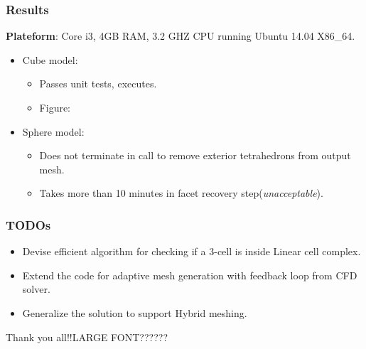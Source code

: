 \documentclass{beamer}
\begin{document}
	\begin{frame}
		\frametitle{Results} 	
		\textbf{Plateform}: Core i3, 4GB RAM, 3.2 GHZ CPU running Ubuntu 14.04 X86\_64.	
			\begin{itemize}
				\item Cube model:
					\begin{itemize}
						\item Passes unit tests, executes.
						\item Figure:
					\end{itemize}
				\item Sphere model:
					\begin{itemize}
						\item Does not terminate in call to remove exterior tetrahedrons from output mesh.
						\item Takes more than 10 minutes in facet recovery step(\textit{unacceptable}).
					\end{itemize}		
			\end{itemize}		
	\end{frame}	
	\begin{frame}
		\frametitle{TODOs}
			\begin{itemize}
				\item Devise efficient algorithm for checking if a 3-cell is inside Linear cell complex.
				\item Extend the code for adaptive mesh generation with feedback loop from CFD solver. 
				\item Generalize the solution to support Hybrid meshing. 		
			\end{itemize}
		\end{frame}	
	\begin{frame}
		Thank you all!!{LARGE FONT??????}
	\end{frame}	


\end{document}
